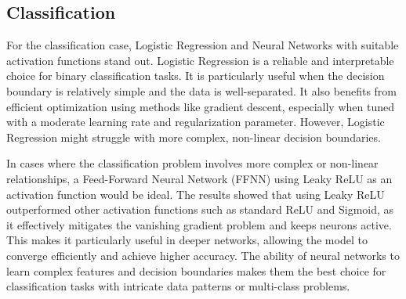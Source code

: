 \subsection{Classification}

For the classification case, Logistic Regression and Neural Networks with suitable activation functions stand out. Logistic Regression is a reliable and interpretable choice for binary classification tasks. It is particularly useful when the decision boundary is relatively simple and the data is well-separated. It also benefits from efficient optimization using methods like gradient descent, especially when tuned with a moderate learning rate and regularization parameter. However, Logistic Regression might struggle with more complex, non-linear decision boundaries.

In cases where the classification problem involves more complex or non-linear relationships, a Feed-Forward Neural Network (FFNN) using Leaky ReLU as an activation function would be ideal. The results showed that using Leaky ReLU outperformed other activation functions such as standard ReLU and Sigmoid, as it effectively mitigates the vanishing gradient problem and keeps neurons active. This makes it particularly useful in deeper networks, allowing the model to converge efficiently and achieve higher accuracy. The ability of neural networks to learn complex features and decision boundaries makes them the best choice for classification tasks with intricate data patterns or multi-class problems.